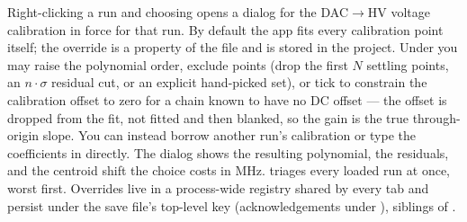 Right-clicking a run and choosing  opens a dialog
for the DAC$\rightarrow$HV voltage calibration in force for that run. By
default the app fits every calibration point itself; the override is a
property of the file and is stored in the project. Under
 you may raise the polynomial order,
exclude points (drop the first $N$ settling points, an $n\!\cdot\!\sigma$
residual cut, or an explicit hand-picked set), or tick
 to constrain the
calibration offset to zero for a chain known to have no DC offset --- the
offset is dropped from the fit, not fitted and then blanked, so the
gain is the true through-origin slope. You can instead borrow another
run's calibration or type the coefficients in directly. The dialog shows
the resulting polynomial, the residuals, and the centroid shift the
choice costs in MHz.  triages every
loaded run at once, worst first. Overrides live in a process-wide
registry shared by every tab and persist under the save file's
top-level  key (acknowledgements under
), siblings of .
